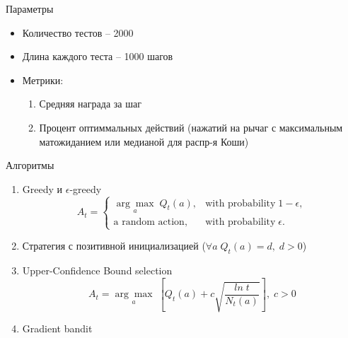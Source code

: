 \documentclass[11pt]{beamer} %
\begin{document}
    \begin{frame}{Параметры}
        \begin{itemize}
            \item<1-> Количество тестов -- 2000
            \item<2-> Длина каждого теста -- 1000 шагов
            \item<3-> Метрики:
            \begin{enumerate}
                \item Средняя награда за шаг
                \item Процент оптиммальных действий (нажатий на рычаг с максимальным матожиданием или медианой для распр-я Коши)
            \end{enumerate}
        \end{itemize}
    \end{frame}
    \begin{frame}{Алгоритмы}
        \begin{enumerate}
            \item<1-> Greedy и $\epsilon$-greedy
                $$A_t = \begin{cases}
            \underset{a}{\arg \max} \; Q_t(a), & \text{with probability} \; 1 - \epsilon, \\
            \text{a random action}, & \text{with probability} \; \epsilon.
            \end{cases}$$ 
            \item<2-> Стратегия с позитивной инициализацией ($\forall a \; Q_t(a) = d, \; d > 0$)
            \item<3-> Upper-Confidence Bound selection $$A_t = \underset{a}{\arg \max} \; \left[ Q_t(a) + c \sqrt{\frac{ln \; t}{N_t(a)}} \right], \; c > 0$$
            \item<4-> Gradient bandit
        \end{enumerate}
    \end{frame}
\end{document}
